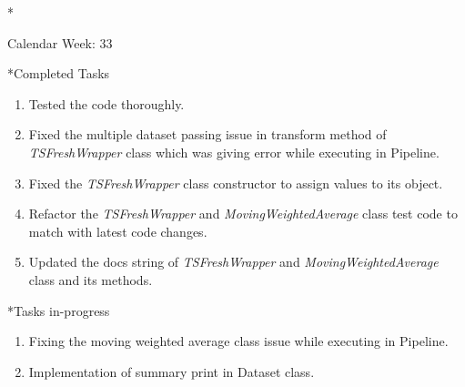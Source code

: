 \documentclass[11pt,a4paper]{article}
\begin{document}
\newpage
\begin{section}*{Calendar Week: 33 \hfill \date{20 August, 2021}}
 \begin{subsection}*{Completed Tasks}
     \begin{enumerate}
         \item Tested the code thoroughly.
         \item Fixed the multiple dataset passing issue in transform method of \textit{TSFreshWrapper} class which was giving error while executing in Pipeline.
         \item Fixed the \textit{TSFreshWrapper} class constructor to assign values to its object.
         \item Refactor the \textit{TSFreshWrapper} and \textit{MovingWeightedAverage} class test code to match with latest code changes.
         \item Updated the docs string of \textit{TSFreshWrapper} and \textit{MovingWeightedAverage} class and its methods.
     \end{enumerate}
 \end{subsection}
 \begin{subsection}*{Tasks in-progress}
     \begin{enumerate}
         \item Fixing the moving weighted average class issue while executing in Pipeline.
         \item Implementation of summary print in Dataset class.
     \end{enumerate}
 \end{subsection}
\end{section}
\end{document}

